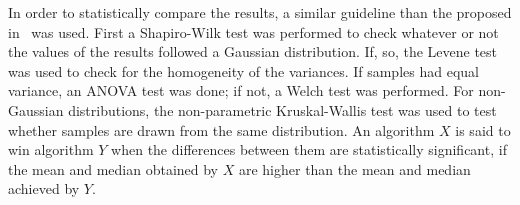 %
In order to statistically compare the \HV{} results, a similar guideline than the proposed in~\cite{Joel:StatisticalTest} was used. 
%
First a Shapiro-Wilk test was performed to check whatever or not the values of the results followed a Gaussian distribution. 
%
If, so, the Levene test was used to check for the homogeneity of the variances. 
%
If samples had equal variance, an ANOVA test was done; if not, a Welch test was performed. 
%
For non-Gaussian distributions, the non-parametric Kruskal-Wallis test was used to test whether samples are drawn from the same distribution. 
%
An algorithm $X$ is said to win algorithm $Y$ when the differences between them are statistically significant, if the mean and median obtained by $X$ are higher than the mean and median achieved by $Y$.
%

